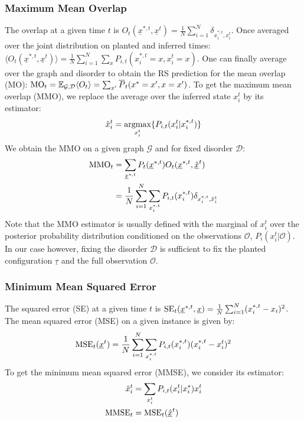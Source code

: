 \documentclass[a4paper, amsfonts, amssymb, amsmath, reprint, showkeys, nofootinbib, twoside, floatfix, pre,superscriptaddress, onecolumn]{revtex4-2}
\begin{document}
\subsubsection{Maximum Mean Overlap}
The overlap at a given time $t$ is $O_t(\underline{x}^{*,t},\underline{x}^t) = \frac{1}{N}\sum_{i=1}^N\delta_{x_i^{*,t},x_i^t}$. Once averaged over the joint distribution on planted and inferred times: $\langle O_t(\underline{x}^{*,t},\underline{x}^t)\rangle = \frac{1}{N}\sum_{i=1}^N\sum_x P_{i,t}(x_i^{*,t}=x,x_i^t=x)$. One can finally average over the graph and disorder to obtain the RS prediction for the mean overlap (MO): ${\rm MO}_t = \mathbb{E}_{\mathcal{G},\mathcal{D}}\langle O_t\rangle =\sum_{x'}\overline{P}_t(x^*=x',x=x')$.
To get the maximum mean overlap (MMO), we replace the average over the inferred state $x_i^t$ by its estimator:
\begin{align}
	\hat{x}_i^t = \underset{x_i^t}{\rm argmax}\{P_{i,t}(x_i^t|x_i^{*,t})\}
\end{align}
We obtain the MMO on a given graph $\mathcal{G}$ and for fixed disorder $\mathcal{D}$:
\begin{align}
\begin{aligned}
	{\rm MMO}_t &= \sum_{\underline{x}^{*,t}}P_{t}(\underline{x}^{*,t})O_t(\underline{x}^{*,t},\underline{\hat{x}}^t) \\
	&=\frac{1}{N}\sum_{i=1}^N\sum_{x_i^{*,t}}P_{i,t}(x_i^{*,t})\delta_{x_i^{*,t},\hat{x}_i^t}
\end{aligned}
\end{align} 
Note that the MMO estimator is usually defined with the marginal of $x_i^t$ over the posterior probability distribution conditioned on the observations $\mathcal{O}$, $P_i(x_i^t|\mathcal{O})$. 
In our case however, fixing the disorder $\mathcal{D}$ is sufficient to fix the planted configuration $\underline{\tau}$ and the full observation $\mathcal{O}$. 

\subsubsection{Minimum Mean Squared Error}
The squared error (SE) at a given time $t$ is ${\rm SE}_t(\underline{x}^{*,t},\underline{x}) = \frac{1}{N}\sum_{i=1}^N(x_i^{*,t}-x_i)^2$. The mean squared error (MSE) on a given instance is given by:
\begin{align}
	{\rm MSE}_t(\underline{x}^t) = \frac{1}{N}\sum_{i=1}^N\sum_{x_i^{*,t}}P_{i,t}(x_i^{*,t})(x_i^{*,t}-x_i^t)^2
\end{align}
To get the minimum mean squared error (MMSE), we consider its estimator:
\begin{align}
\begin{aligned}
	\hat{x}_i^t &= \sum_{x_i^t}P_{i,t}(x_i^t|x_i^*)x_i^t \\
	{\rm MMSE}_t &= {\rm MSE}_t(\underline{\hat{x}}^t)
\end{aligned}
\end{align}
\end{document}

